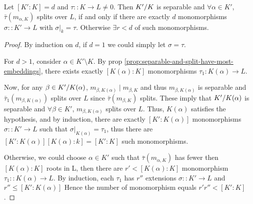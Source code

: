 \begin{prop}\label{prop:separable-field-split-have-most-embeddings}
  Let $[K': K] = d$ and $\tau:: K \to L \neq 0$. Then ${K'}/{K}$ is separable and $\forall \alpha \in K'$,
  $\bar\tau(m_{\alpha, K})$ splits over $L$, if and only if there are exactly
  $d$ monomorphisms $\sigma::K' \to L$ with $\sigma\big|_k = \tau$.
  Otherwise $\exists r < d$ of such monomorphisms.

  \begin{proof}
    By induction on $d$, if $d = 1$ we could simply let $\sigma = \tau$.

    For $d > 1$, consider $\alpha \in K' \setminus K$.
    By prop \ref{prop:separable-and-split-have-most-embeddings}, there exists
    exactly $[K(\alpha): K]$ monomorphisms $\tau_1: K(\alpha) \to L$.

    Now, for any $\beta \in {K'}/{K(\alpha)}$,
    $m_{\beta, K(\alpha)} \mid m_{\beta, K}$ and thus $m_{\beta, K(\alpha)}$ is separable
    and $\bar\tau_1(m_{\beta, K(\alpha)})$ splits over $L$ since $\bar\tau(m_{\beta, K})$ splits.
    These imply that ${K'}/{K(\alpha)}$ is separable and $\forall \beta \in K'$,
    $m_{\beta, K(\alpha)}$ splits over $L$. Thus, $K(\alpha)$ satisfies the hypothesis,
    and by induction, there are exactly $[K': K(\alpha)]$ monomorphisms $\sigma :: K' \to L$
    such that $\sigma\big|_{K(\alpha)} = \tau_1$, thus there are $[K': K(\alpha)][K(\alpha): k]
    = [K': K]$ such monomorphisms.

    Otherwise, we could choose $\alpha \in K'$ such that $\bar\tau(m_{\alpha, K})$ has fewer
    then $[K(\alpha): K]$ roots in L, then there are $r' < [K(\alpha): K]$ monomorphism $\tau_1 :: K(\alpha)
    \to L$. By induction, each $\tau_1$ has $r''$ extensions $\sigma :: K' \to L$ and $r'' \leq [K': K(\alpha)]$
    Hence the number of monomorphism equals $r' r'' < [K': K]$.
  \end{proof}
\end{prop}

